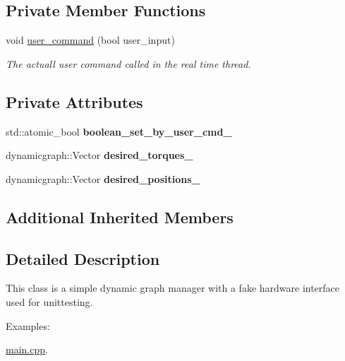 \subsection*{Private Member Functions}
\begin{DoxyCompactItemize}
\item 
void \hyperlink{classdynamic__graph__manager_1_1SimpleDGM_a6ba8314169c29c722cdcea810798f08d}{user\+\_\+command} (bool user\+\_\+input)
\begin{DoxyCompactList}\small\item\em The actuall user command called in the real time thread. \end{DoxyCompactList}\end{DoxyCompactItemize}
\subsection*{Private Attributes}
\begin{DoxyCompactItemize}
\item 
\mbox{\label{classdynamic__graph__manager_1_1SimpleDGM_aa8dfcc77796249b13b61b7a3c4a54d3e}} 
std\+::atomic\+\_\+bool {\bfseries boolean\+\_\+set\+\_\+by\+\_\+user\+\_\+cmd\+\_\+}
\item 
\mbox{\label{classdynamic__graph__manager_1_1SimpleDGM_a4bebf8a5b309160a26bfcc9c1f18f9df}} 
dynamicgraph\+::\+Vector {\bfseries desired\+\_\+torques\+\_\+}
\item 
\mbox{\label{classdynamic__graph__manager_1_1SimpleDGM_a46ad5e1d2ac144f8bc799480b6dfda45}} 
dynamicgraph\+::\+Vector {\bfseries desired\+\_\+positions\+\_\+}
\end{DoxyCompactItemize}
\subsection*{Additional Inherited Members}


\subsection{Detailed Description}
This class is a simple dynamic graph manager with a fake hardware interface used for unittesting. \begin{Desc}
\item[Examples\+: ]\par
\hyperlink{main_8cpp-example}{main.\+cpp}.\end{Desc}



